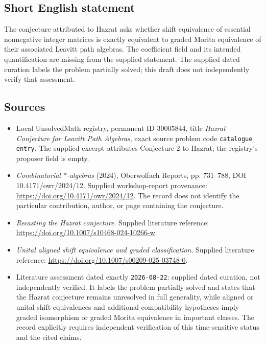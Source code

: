 \documentclass[11pt]{article}
\begin{document}
\subsection{Short English statement}
The conjecture attributed to Hazrat asks whether shift equivalence of essential nonnegative integer matrices is exactly equivalent to graded Morita equivalence of their associated Leavitt path algebras. The coefficient field and its intended quantification are missing from the supplied statement. The supplied dated curation labels the problem partially solved; this draft does not independently verify that assessment.
\subsection{Sources}
\begin{itemize}
\item Local UnsolvedMath registry, permanent ID \(30005844\), title \emph{Hazrat Conjecture for Leavitt Path Algebras}, exact source problem code \texttt{catalogue entry}. The supplied excerpt attributes Conjecture 2 to Hazrat; the registry's proposer field is empty.
\item \emph{Combinatorial \(*\)-algebras} (2024), Oberwolfach Reports, pp. 731--788, DOI 10.4171/owr/2024/12. Supplied workshop-report provenance: \url{https://doi.org/10.4171/owr/2024/12}. The record does not identify the particular contribution, author, or page containing the conjecture.
\item \emph{Recasting the Hazrat conjecture}. Supplied literature reference: \url{https://doi.org/10.1007/s10468-024-10266-w}.
\item \emph{Unital aligned shift equivalence and graded classification}. Supplied literature reference: \url{https://doi.org/10.1007/s00209-025-03748-0}.
\item Literature assessment dated exactly \texttt{2026-08-22}: supplied dated curation, not independently verified. It labels the problem partially solved and states that the Hazrat conjecture remains unresolved in full generality, while aligned or unital shift equivalences and additional compatibility hypotheses imply graded isomorphism or graded Morita equivalence in important classes. The record explicitly requires independent verification of this time-sensitive status and the cited claims.
\end{itemize}
\end{document}

